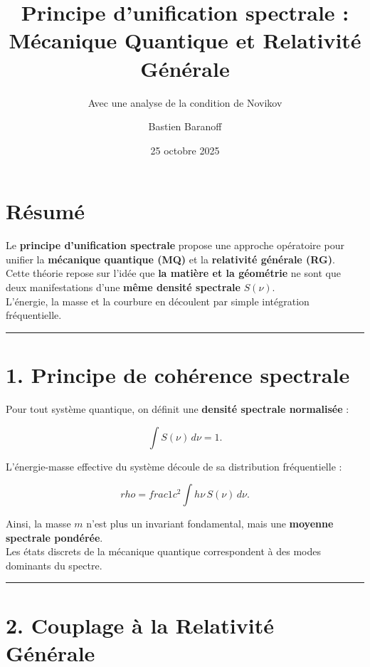 \documentclass[
  11pt,
]{article}
\title{Principe d'unification spectrale : Mécanique Quantique et
Relativité Générale}
\subtitle{Avec une analyse de la condition de Novikov}
\author{Bastien Baranoff}
\date{25 octobre 2025}
\begin{document}
\maketitle

\hypertarget{ruxe9sumuxe9}{%
\section{Résumé}\label{ruxe9sumuxe9}}

Le \textbf{principe d'unification spectrale} propose une approche
opératoire pour unifier la \textbf{mécanique quantique (MQ)} et la
\textbf{relativité générale (RG)}.\\
Cette théorie repose sur l'idée que \textbf{la matière et la géométrie}
ne sont que deux manifestations d'une \textbf{même densité spectrale}
\(S(\nu)\).\\
L'énergie, la masse et la courbure en découlent par simple intégration
fréquentielle.

\begin{center}\rule{0.5\linewidth}{0.5pt}\end{center}

\hypertarget{principe-de-cohuxe9rence-spectrale}{%
\section{1. Principe de cohérence
spectrale}\label{principe-de-cohuxe9rence-spectrale}}

Pour tout système quantique, on définit une \textbf{densité spectrale
normalisée} :

\[
\int S(\nu)\, d\nu = 1.
\]

L'énergie-masse effective du système découle de sa distribution
fréquentielle :

\[
rho = frac{1}{c^2} \int h\nu\, S(\nu)\, d\nu.
\]

Ainsi, la masse \(m\) n'est plus un invariant fondamental, mais une
\textbf{moyenne spectrale pondérée}.\\
Les états discrets de la mécanique quantique correspondent à des modes
dominants du spectre.

\begin{center}\rule{0.5\linewidth}{0.5pt}\end{center}

\hypertarget{couplage-uxe0-la-relativituxe9-guxe9nuxe9rale}{%
\section{2. Couplage à la Relativité
Générale}\label{couplage-uxe0-la-relativituxe9-guxe9nuxe9rale}}
\end{document}
